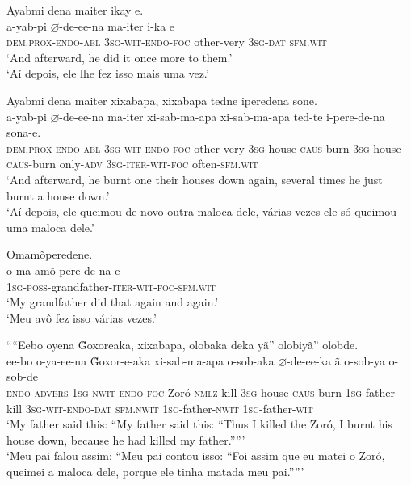 \documentclass[output=paper,
modfonts,nonflat
]{langsci/langscibook}
\begin{document}
  
\ea Ayabmi dena maiter ikay e.\\[.3em]
\gll a-yab-pi \(\varnothing\)-de-ee-na ma-iter i-ka e\\
\textsc{dem.prox-endo-abl} \textsc{3sg-wit-endo-foc} other-very \textsc{3sg-dat} \textsc{sfm.wit}\\
\glt ‘And afterward, he did it once more to them.’\\
\glt ‘Aí depois, ele lhe fez isso mais uma vez.’\\
\z

\newpage 
\ea Ayabmi dena maiter xixabapa, xixabapa tedne iperedena sone.\\[.3em]
\gll a-yab-pi \(\varnothing\)-de-ee-na ma-iter xi-sab-ma-apa xi-sab-ma-apa ted-te i-pere-de-na sona-e.\\
\textsc{dem.prox-endo-abl} \textsc{3sg-wit-endo-foc} other-very \textsc{3sg}-house-\textsc{caus}-burn \textsc{3sg}-house-\textsc{caus}-burn only-\textsc{adv} \textsc{3sg-iter-wit-foc} often-\textsc{sfm.wit}\\
\glt ‘And afterward, he burnt one their houses down again, several times he just burnt a house down.’\\
\glt ‘Aí depois, ele queimou de novo  outra maloca dele, várias vezes ele só queimou uma maloca dele.’\\
\z

\ea Omamõperedene.\\[.3em]
\gll o-ma-amõ-pere-de-na-e\\
\textsc{1sg-poss}-grandfather-\textsc{iter-wit-foc-sfm.wit}\\
\glt ‘My grandfather did that again and again.’\\
 \glt ‘Meu avô fez isso várias vezes.’\\
\z

\ea ““Eebo oyena \~{G}oxoreaka, xixabapa, olobaka deka yã” olobiyã” olobde.\\[.3em]
\gll ee-bo o-ya-ee-na \~{G}oxor-e-aka xi-sab-ma-apa o-sob-aka \(\varnothing\)-de-ee-ka ã o-sob-ya o-sob-de\\
\textsc{endo-advers} \textsc{1sg-nwit-endo-foc} Zoró-\textsc{nmlz}-kill \textsc{3sg}-house-\textsc{caus}-burn \textsc{1sg}-father-kill \textsc{3sg-wit-endo-dat} \textsc{sfm.nwit} \textsc{1sg}-father-\textsc{nwit} \textsc{1sg}-father-\textsc{wit}\\
\glt ‘My father said this: “My father said this: “Thus I killed the Zoró, I burnt his house down, because he had killed my father.””’\\
\glt ‘Meu pai falou assim: “Meu pai contou isso: “Foi assim que eu matei o Zoró, queimei a maloca dele, porque ele tinha matada meu pai.””’\\
\z
\end{document}
